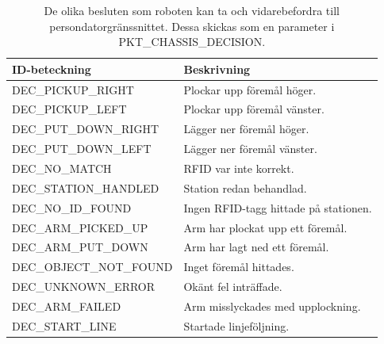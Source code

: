 \begin{table}[H]
\label{decision}
\begin{tabularx}{\textwidth}{|l|X|}
\hline
\textbf{ID-beteckning} & \textbf{Beskrivning} \\ \hline
DEC\_PICKUP\_RIGHT & Plockar upp föremål höger. \\ \hline
DEC\_PICKUP\_LEFT & Plockar upp föremål vänster. \\ \hline
DEC\_PUT\_DOWN\_RIGHT & Lägger ner föremål höger. \\ \hline
DEC\_PUT\_DOWN\_LEFT & Lägger ner föremål vänster.  \\ \hline
DEC\_NO\_MATCH & RFID var inte korrekt.  \\ \hline
DEC\_STATION\_HANDLED & Station redan behandlad.  \\ \hline
DEC\_NO\_ID\_FOUND & Ingen RFID-tagg hittade på stationen.  \\ \hline
DEC\_ARM\_PICKED\_UP & Arm har plockat upp ett föremål. \\ \hline
DEC\_ARM\_PUT\_DOWN & Arm har lagt ned ett föremål. \\ \hline
DEC\_OBJECT\_NOT\_FOUND & Inget föremål hittades. \\ \hline
DEC\_UNKNOWN\_ERROR & Okänt fel inträffade. \\ \hline
DEC\_ARM\_FAILED & Arm misslyckades med upplockning. \\ \hline
DEC\_START\_LINE & Startade linjeföljning. \\ \hline
\end{tabularx}
\caption{De olika besluten som roboten kan ta och vidarebefordra till persondatorgränssnittet. Dessa skickas som en parameter i PKT\_CHASSIS\_DECISION.}
\end{table}
